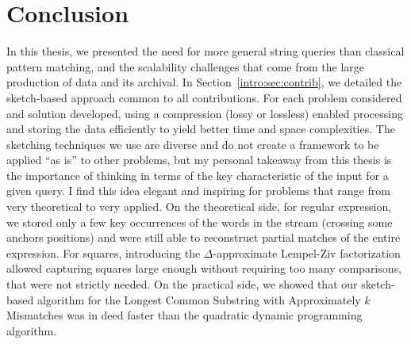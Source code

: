 \clearemptydoublepage
\backmatter

\chapter*{Conclusion}
In this thesis, we presented the need for more general string queries than classical pattern matching, and the scalability challenges that come from the large production of data and its archival.
%
In Section~\ref*{intro:sec:contrib}, we detailed the sketch-based approach common to all contributions. For each problem considered and solution developed, using a compression (lossy or lossless) enabled processing and storing the data efficiently to yield better time and space complexities.
%
The sketching techniques we use are diverse and do not create a framework to be applied ``as is'' to other problems, but my personal takeaway from this thesis is the importance of thinking in terms of the key characteristic of the input for a given query. 
%
I find this idea elegant and inspiring for problems that range from very theoretical to very applied. On the theoretical side, for regular expression, we stored only a few key occurrences of the words in the stream (crossing some anchors positions) and were still able to reconstruct partial matches of the entire expression. For squares, introducing the $\Delta$-approximate Lempel-Ziv factorization allowed capturing squares large enough without requiring too many comparisons, that were not strictly needed. On the practical side, we showed that our sketch-based algorithm for the Longest Common Substring with Approximately $k$ Mismatches was in deed faster than the quadratic dynamic programming algorithm. 
%
%
%

